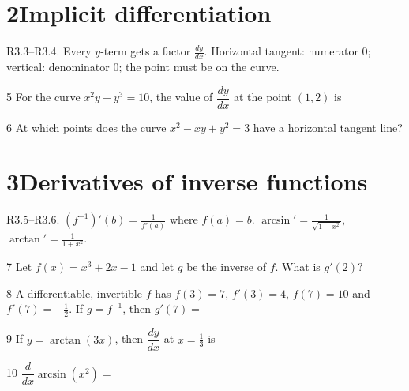 \documentclass{apcalc}
\begin{document}
\section*{2\quad Implicit differentiation}
\begin{setrule}R3.3–R3.4. Every $y$-term gets a factor $\frac{dy}{dx}$. Horizontal tangent: numerator 0; vertical: denominator 0; the point must be on the curve.\end{setrule}
\begin{q}{5}
For the curve $x^2y+y^3=10$, the value of $\dfrac{dy}{dx}$ at the point $(1,2)$ is
\end{q}
\begin{q}{6}
At which points does the curve $x^2-xy+y^2=3$ have a horizontal tangent line?
\end{q}
\section*{3\quad Derivatives of inverse functions}
\begin{setrule}R3.5–R3.6. $(f^{-1})'(b)=\frac{1}{f'(a)}$ where $f(a)=b$. $\arcsin'=\frac{1}{\sqrt{1-x^2}}$, $\arctan'=\frac{1}{1+x^2}$.\end{setrule}
\begin{q}{7}
Let $f(x)=x^3+2x-1$ and let $g$ be the inverse of $f$. What is $g'(2)$?
\end{q}
\begin{q}{8}
A differentiable, invertible $f$ has $f(3)=7$, $f'(3)=4$, $f(7)=10$ and $f'(7)=-\frac12$. If $g=f^{-1}$, then $g'(7)=$
\end{q}
\begin{q}{9}
If $y=\arctan(3x)$, then $\dfrac{dy}{dx}$ at $x=\frac13$ is
\end{q}
\begin{q}{10}
$\dfrac{d}{dx}\arcsin(x^2)=$
\end{q}
\end{document}
